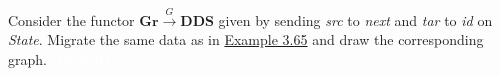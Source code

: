 Consider the functor $\mathbf{Gr}\xrightarrow{G}\mathbf{DDS}$ given by sending \emph{src} to \emph{next} and \emph{tar} to \emph{id} on \emph{State}. Migrate the same data as in \hyperref[X3.65]{Example 3.65} and draw the corresponding graph.\textcolor{white}{NOCARD}